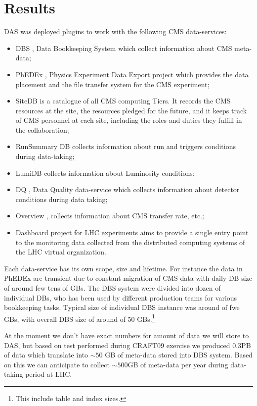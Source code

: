 \documentclass[a4paper]{jpconf}
\begin{document}
\section{Results\label{Results}}
DAS was deployed plugins to work with the following CMS data-services:
\begin{itemize}
\item DBS \cite{DBS}, Data Bookkeeping System which collect information
about CMS meta-data;
\item PhEDEx \cite{PhEDEx}, Physics Experiment Data Export project which
provides the data placement and the file transfer system for the CMS experiment;
\item SiteDB \cite{SiteDB} is a catalogue of all CMS computing Tiers. 
It records the CMS resources at the site, the resources pledged for the 
future, and it keeps track of CMS personnel at each site, including the 
roles and duties they fulfill in the collaboration;
\item RunSummary DB \cite{RunSummary} collects information about run and triggers
conditions during data-taking;
\item LumiDB \cite{LumiDB} collects information about Luminosity conditions;
\item DQ \cite{DQ}, Data Quality data-service which collects information
about detector conditions during data taking;
\item Overview \cite{Overview}, collects information about CMS
transfer rate, etc.;
\item Dashboard \cite{Dashboard} project for LHC experiments aims to 
provide a single entry point to the monitoring data collected from the 
distributed computing systems of the LHC virtual organization.
\end{itemize}
Each data-service has its own scope, size and lifetime. For instance the data
in PhEDEx are transient due to constant migration of CMS data with daily DB size of
around few tens of GBs. The DBS system were divided into dozen of individual DBs, 
who has been used by different production teams for various bookkeeping tasks. Typical
size of individual DBS instance was around of fwe GBs, with overall DBS size of
around of 50 GBs.\footnote{This include table and index sizes.}

At the moment we don't have exact numbers for amount of data we will store to DAS,
but based on test performed during CRAFT09 exercise we produced 0.3PB of data which
translate into $\sim50$ GB of meta-data stored into DBS system. Based on this
we can anticipate to collect $\sim500$GB of meta-data per year during data-taking period
at LHC.
\end{document}
